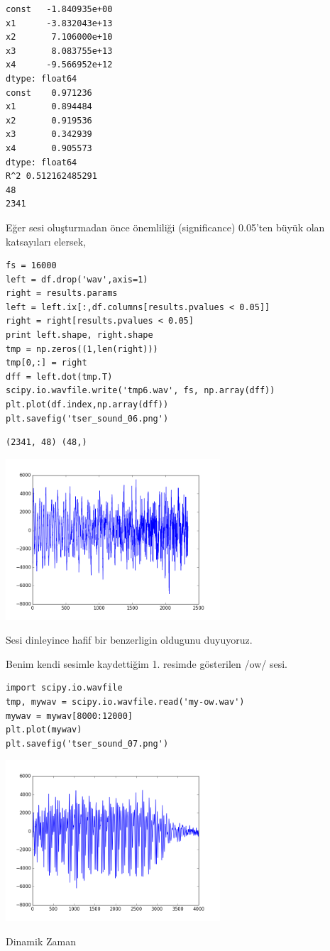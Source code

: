 \documentclass[12pt,fleqn]{article}\usepackage{../../common}
\begin{document}
\begin{verbatim}
const   -1.840935e+00
x1      -3.832043e+13
x2       7.106000e+10
x3       8.083755e+13
x4      -9.566952e+12
dtype: float64
const    0.971236
x1       0.894484
x2       0.919536
x3       0.342939
x4       0.905573
dtype: float64
R^2 0.512162485291
48
2341
\end{verbatim}

Eğer sesi oluşturmadan önce önemliliği (significance) 0.05'ten büyük olan
katsayıları elersek, 

\begin{verbatim}
fs = 16000 
left = df.drop('wav',axis=1)
right = results.params
left = left.ix[:,df.columns[results.pvalues < 0.05]]
right = right[results.pvalues < 0.05]
print left.shape, right.shape
tmp = np.zeros((1,len(right)))
tmp[0,:] = right
dff = left.dot(tmp.T)
scipy.io.wavfile.write('tmp6.wav', fs, np.array(dff))
plt.plot(df.index,np.array(dff))
plt.savefig('tser_sound_06.png')
\end{verbatim}

\begin{verbatim}
(2341, 48) (48,)
\end{verbatim}

\includegraphics[height=6cm]{tser_sound_06.png}

Sesi dinleyince hafif bir benzerligin oldugunu duyuyoruz. 

Benim kendi sesimle kaydettiğim 1. resimde gösterilen /ow/ sesi.

\begin{verbatim}
import scipy.io.wavfile
tmp, mywav = scipy.io.wavfile.read('my-ow.wav')
mywav = mywav[8000:12000]
plt.plot(mywav)
plt.savefig('tser_sound_07.png')
\end{verbatim}

\includegraphics[height=6cm]{tser_sound_07.png}

Dinamik Zaman 
\end{document}
